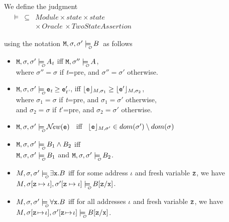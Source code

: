\begin{definition}
 We define the judgment \\
$
\begin{array}{c}
\begin{array}{lcl}
\ \ \  \models   &   \subseteq &   Module \times state \times state \\
& & \times\, Oracle\, \times {TwoStateAssertion}
\end{array}
\end{array}
$

\noindent
using the notation $\Prog{},\sigma,\sigma'\modelsWithO \B $\ as follows
\begin{itemize}
\item
$\Prog{},\sigma,\sigma'\modelsWithO \syntax{\A}_{\textit{t}}$
iff   $\Prog{},\sigma''\modelsWithO \syntax{\A}$, \\
where  $\sigma''=\sigma$ if  {{\textit{t}}}=\textsf{pre}, and  $\sigma''=\sigma'$ otherwise.
\item
$\Prog{},\sigma,\sigma'\modelsWithO \syntax{\sE}_{\textit{t}} \geq \sE'_{\textit{t'}}$,
    iff ${\lfloor{ {{{{\ensuremath{\textrm{\ttfamily{e}}}}}}}}\rfloor_{M,\sigma_1}} \geq {\ensuremath{\lfloor{ {{{{\ensuremath{\textrm{\ttfamily{e}}}}}'}}}\rfloor_{M,\sigma_2}}}$,\\
    where $\sigma_1=\sigma$ if  {{\textit{t}}}=\textsf{pre}, and  $\sigma_1=\sigma'$ otherwise,\\
    and $\sigma_2=\sigma$ if  {{\textit{t}}}$'$=\textsf{pre}, and  $\sigma_2=\sigma'$ otherwise.
\item
$\Prog{},\sigma,\sigma'\modelsWithO \New(\syntax{\sE})$
\ iff \
${\lfloor{ {{{{\ensuremath{\textrm{\ttfamily{e}}}}}}}}\rfloor_{M,\sigma'}}\in dom(\sigma')\setminus dom(\sigma)$
\item
$\Prog{},\sigma,\sigma'\modelsWithO  \syntax{\B}_1   \wedge \syntax{\B}_2$   iff\\
 $\Prog{},\sigma,\sigma'\modelsWithO  \syntax{{\B}}_1 $
    and   $\Prog{},\sigma,\sigma'\modelsWithO  \syntax{{\B}}_2  $.
\item
  $\M,\sigma,{\sigma'}  \modelsWithO \exists \prg{x}.\syntax{\B}$ iff for some address $\iota$ and fresh variable ${\textrm{\ttfamily{z}}}$,  we have $\M,\sigma[\prg{z}\mapsto\iota], {\sigma'[\prg{z}\mapsto\iota]} \modelsWithO  \syntax{\B[\prg{z}/\prg{x}}]$.
  \item
  $\M,\sigma,{\sigma'}  \modelsWithO \forall \prg{x}.\syntax{\B}$ iff for all addresses $\iota$ %
  and fresh variable ${\textrm{\ttfamily{z}}}$, we have $\M,\sigma[\prg{z}\!\mapsto\!\iota],\sigma'[\prg{z}\!\mapsto\!\iota]  \modelsWithO  \syntax{\B[\prg{z}/\prg{x}}]$.

\end{itemize}

\end{definition}

